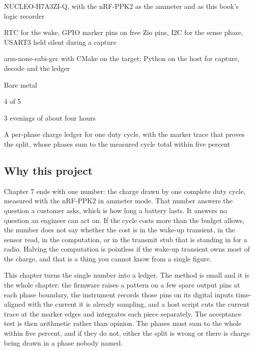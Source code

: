 
\begin{keyfacts}
\item[Board] NUCLEO-H7A3ZI-Q, with the nRF-PPK2 as the ammeter and as this book's logic recorder
\item[Peripherals] RTC for the wake, GPIO marker pins on free Zio pins, I2C for the sense phase, USART3 held silent during a capture
\item[Toolchain] arm-none-eabi-gcc with CMake on the target; Python on the host for capture, decode and the ledger
\item[Operating system] Bare metal
\item[Difficulty] 4 of 5
\item[Effort] 3 evenings of about four hours
\item[Deliverable] A per-phase charge ledger for one duty cycle, with the marker trace that proves the split, whose phases sum to the measured cycle total within five percent
\end{keyfacts}

\subsection*{Why this project}

Chapter 7 ends with one number: the charge drawn by one complete duty cycle,
measured with the nRF-PPK2 in ammeter mode. That number answers the question a
customer asks, which is how long a battery lasts. It answers no question an
engineer can act on. If the cycle costs more than the budget allows, the number
does not say whether the cost is in the wake-up transient, in the sensor read,
in the computation, or in the transmit stub that is standing in for a radio.
Halving the computation is pointless if the wake-up transient owns most of the
charge, and that is a thing you cannot know from a single figure.

This chapter turns the single number into a ledger. The method is small and it
is the whole chapter: the firmware raises a pattern on a few spare output pins
at each phase boundary, the instrument records those pins on its digital inputs
time-aligned with the current it is already sampling, and a host script cuts the
current trace at the marker edges and integrates each piece separately. The
acceptance test is then arithmetic rather than opinion. The phases must sum to
the whole within five percent, and if they do not, either the split is wrong or
there is charge being drawn in a phase nobody named.

